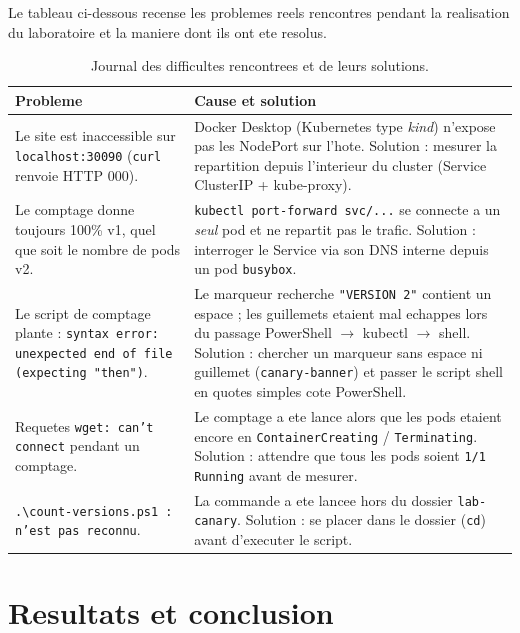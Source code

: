 \documentclass[11pt,a4paper]{report}
\begin{document}
Le tableau ci-dessous recense les problemes reels rencontres pendant la realisation du
laboratoire et la maniere dont ils ont ete resolus.

\begin{table}[h!]
\centering
\renewcommand{\arraystretch}{1.5}
\begin{tabular}{p{5.2cm} p{8.3cm}}
\toprule
\textbf{Probleme} & \textbf{Cause et solution} \\
\midrule
Le site est inaccessible sur \texttt{localhost:30090} (\texttt{curl} renvoie HTTP 000). &
Docker Desktop (Kubernetes type \emph{kind}) n'expose pas les NodePort sur l'hote. Solution :
mesurer la repartition depuis l'interieur du cluster (Service ClusterIP + kube-proxy). \\
\addlinespace
Le comptage donne toujours 100\% v1, quel que soit le nombre de pods v2. &
\texttt{kubectl port-forward svc/...} se connecte a un \emph{seul} pod et ne repartit pas le
trafic. Solution : interroger le Service via son DNS interne depuis un pod \texttt{busybox}. \\
\addlinespace
Le script de comptage plante : \texttt{syntax error: unexpected end of file (expecting "then")}. &
Le marqueur recherche \texttt{"VERSION 2"} contient un espace ; les guillemets etaient mal
echappes lors du passage PowerShell $\rightarrow$ kubectl $\rightarrow$ shell. Solution :
chercher un marqueur sans espace ni guillemet (\texttt{canary-banner}) et passer le script
shell en quotes simples cote PowerShell. \\
\addlinespace
Requetes \texttt{wget: can't connect} pendant un comptage. &
Le comptage a ete lance alors que les pods etaient encore en \texttt{ContainerCreating} /
\texttt{Terminating}. Solution : attendre que tous les pods soient \texttt{1/1 Running}
avant de mesurer. \\
\addlinespace
\texttt{.\textbackslash count-versions.ps1 : n'est pas reconnu}. &
La commande a ete lancee hors du dossier \texttt{lab-canary}. Solution : se placer dans le
dossier (\texttt{cd}) avant d'executer le script. \\
\bottomrule
\end{tabular}
\caption{Journal des difficultes rencontrees et de leurs solutions.}
\end{table}

\section{Resultats et conclusion}
\end{document}
